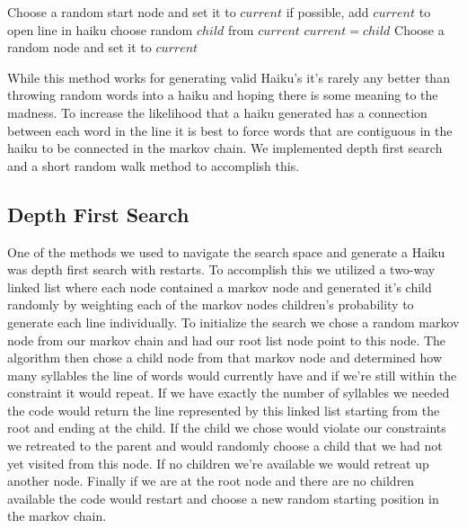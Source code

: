 \documentclass[]{article}
\begin{document}
\begin{algorithm}[H]
	\caption{$Naive\_Search()$} \label{Naive}
	\begin{algorithmic}[1]
		\State Choose a random start node and set it to $current$
			\State if possible, add $current$ to open line in haiku
				\State choose random $child$ from $current$
				\State $current = child$
			\Else
				\State Choose a random node and set it to $current$
			\EndIf
		\EndWhile
	\end{algorithmic}
\end{algorithm}

While this method works for generating valid Haiku's it's rarely any better than throwing random words into a haiku and hoping there is some meaning to the madness. To increase the likelihood that a haiku generated has a connection between each word in the line it is best to force words that are contiguous in the haiku to be connected in the markov chain. We implemented depth first search and a short random walk method to accomplish this.

\subsection{Depth First Search}
One of the methods we used to navigate the search space and generate a Haiku was depth first search with restarts. To accomplish this we utilized a two-way linked list where each node contained a markov node and generated it's child randomly by weighting each of the markov nodes children's probability to generate each line individually. To initialize the search we chose a random markov node from our markov chain and had our root list node point to this node. The algorithm then chose a child node from that markov node and determined how many syllables the line of words would currently have and if we're still within the constraint it would repeat. If we have exactly the number of syllables we needed the code would return the line represented by this linked list starting from the root and ending at the child. If the child we chose would violate our constraints we retreated to the parent and would randomly choose a child that we had not yet visited from this node. If no children we're available we would retreat up another node. Finally if we are at the root node and there are no children available the code would restart and choose a new random starting position in the markov chain.
\end{document}
